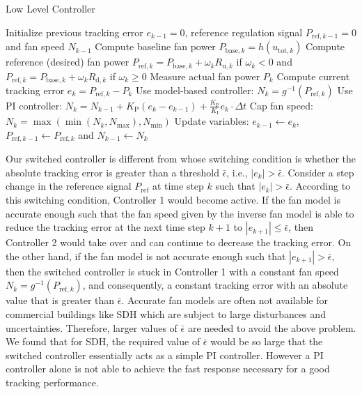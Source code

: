 \begin{algorithm}
\caption{Low Level Controller}
\label{alg:llc}
\begin{algorithmic}[1]
\State Initialize previous tracking error $e_{k-1} = 0$, reference regulation signal $P_{\text{ref},k-1}=0$ and fan speed $N_{k-1}$ 
	\State Compute baseline fan power $P_{\text{base},k} = h(u_{\text{tot},k})$
	\State Compute reference (desired) fan power $P_{\text{ref},k} = P_{\text{base},k}+\omega_k R_{\text{u},k}$ if $\omega_k<0$ and $P_{\text{ref},k} = P_{\text{base},k}+\omega_k R_{\text{d},k}$ if $\omega_k \geq0$
	\State Measure actual fan power $P_k$
	\State Compute current tracking error $e_k = P_{\text{ref},k} - P_k$ 
		\State Use model-based controller:
    		\State $N_k = g^{-1}(P_{\text{ref},k})$
    	\Else
		\State Use PI controller:
        	\State $N_k = N_{k-1} + K_\text{P} (e_k-e_{k-1})+\frac{K_\text{P}}{K_\text{I}} e_k \cdot \Delta t$	
    	\EndIf
	\State Cap fan speed: $N_k = \max(\min(N_k,N_\text{max}),N_\text{min})$
	\State Update variables: $e_{k-1} \gets e_k$, $P_{\text{ref},k-1} \gets P_{\text{ref},k}$ and $N_{k-1} \gets N_k$
\EndWhile
\end{algorithmic}
\end{algorithm}

Our switched controller is different from \cite{Vrettos:2016flexlab1} whose switching condition is whether the absolute tracking error is greater than a threshold $\bar{\epsilon}$, i.e., $|e_k|>\bar{\epsilon}$. 
Consider a step change in the reference signal $P_{\text{ref}}$ at time step $k$ such that $|e_k|>\bar{\epsilon}$. 
According to this switching condition, Controller 1 would become active. 
If the fan model is accurate enough such that the fan speed given by the inverse fan model is able to reduce the tracking error at the next time step $k+1$ to $|e_{k+1}| \leq \bar{\epsilon}$, then Controller 2 would take over and can continue to decrease the tracking error. 
On the other hand, if the fan model is not accurate enough such that $|e_{k+1}| > \bar{\epsilon}$, then the switched controller is stuck in Controller 1 with a constant fan speed $N_k = g^{-1}(P_{\text{ref},k})$, %
and consequently, a constant tracking error with an absolute value that is greater than $\bar{\epsilon}$.
Accurate fan models are often not available for commercial buildings like SDH which are subject to large disturbances and uncertainties. 
Therefore, larger values of $\bar{\epsilon}$ are needed to avoid the above problem. 
We found that for SDH, the required value of $\bar{\epsilon}$ would be so large that the switched controller essentially acts as a simple PI controller. 
However a PI controller alone is not able to achieve the fast response necessary for a good tracking performance.%

